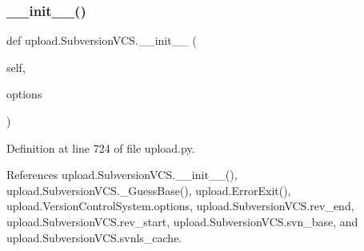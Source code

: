 \mbox{\label{classupload_1_1SubversionVCS_a8333f94e27335ce83eed0cc3f5a1eeb0}} 
\subsubsection{\texorpdfstring{\+\_\+\+\_\+init\+\_\+\+\_\+()}{\_\_init\_\_()}\hspace{0.1cm}{\footnotesize\ttfamily [2/2]}}
{\footnotesize\ttfamily def upload.\+Subversion\+V\+C\+S.\+\_\+\+\_\+init\+\_\+\+\_\+ (\begin{DoxyParamCaption}\item[{}]{self,  }\item[{}]{options }\end{DoxyParamCaption})}



Definition at line 724 of file upload.\+py.



References upload.\+Subversion\+V\+C\+S.\+\_\+\+\_\+init\+\_\+\+\_\+(), upload.\+Subversion\+V\+C\+S.\+\_\+\+Guess\+Base(), upload.\+Error\+Exit(), upload.\+Version\+Control\+System.\+options, upload.\+Subversion\+V\+C\+S.\+rev\+\_\+end, upload.\+Subversion\+V\+C\+S.\+rev\+\_\+start, upload.\+Subversion\+V\+C\+S.\+svn\+\_\+base, and upload.\+Subversion\+V\+C\+S.\+svnls\+\_\+cache.


